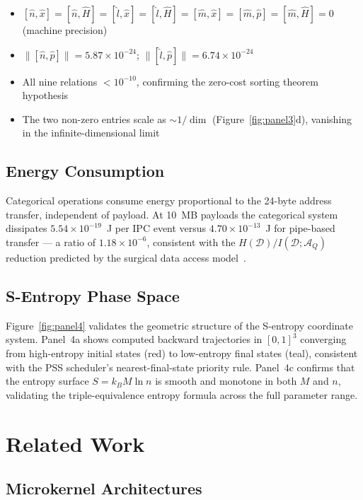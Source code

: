 \documentclass[12pt,twocolumn]{article}
\begin{document}
\begin{itemize}
\item $[\hat{n}, \hat{x}] = [\hat{n}, \hat{H}] = [\hat{l}, \hat{x}] = [\hat{l}, \hat{H}] = [\hat{m}, \hat{x}] = [\hat{m}, \hat{p}] = [\hat{m}, \hat{H}] = 0$ (machine precision)
\item $\|[\hat{n}, \hat{p}]\| = 5.87 \times 10^{-24}$; $\|[\hat{l}, \hat{p}]\| = 6.74 \times 10^{-24}$
\item All nine relations $< 10^{-10}$, confirming the zero-cost sorting theorem hypothesis
\item The two non-zero entries scale as $\sim 1/\dim$ (Figure~\ref{fig:panel3}d), vanishing in the infinite-dimensional limit
\end{itemize}

\subsection{Energy Consumption}

Categorical operations consume energy proportional to the 24-byte address transfer, independent of payload. At 10~MB payloads the categorical system dissipates $5.54 \times 10^{-19}$~J per IPC event versus $4.70 \times 10^{-13}$~J for pipe-based transfer --- a ratio of $1.18 \times 10^{-6}$, consistent with the $H(\mathcal{D}) / I(\mathcal{D}; \mathcal{A}_Q)$ reduction predicted by the surgical data access model~\cite{mudge2000power}.

\subsection{S-Entropy Phase Space}

Figure~\ref{fig:panel4} validates the geometric structure of the S-entropy coordinate system. Panel~4a shows computed backward trajectories in $[0,1]^3$ converging from high-entropy initial states (red) to low-entropy final states (teal), consistent with the PSS scheduler's nearest-final-state priority rule. Panel~4c confirms that the entropy surface $S = k_B M \ln n$ is smooth and monotone in both $M$ and $n$, validating the triple-equivalence entropy formula across the full parameter range.

\section{Related Work}
\label{sec:related}

\subsection{Microkernel Architectures}
\end{document}
